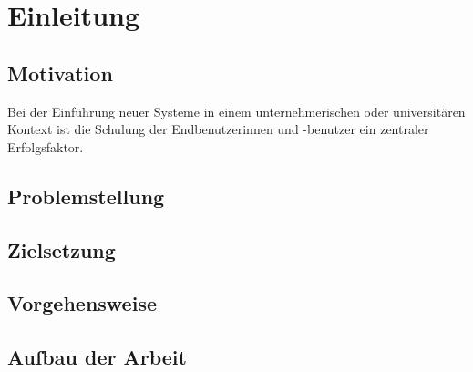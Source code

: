 \chapter{Einleitung}
\section{Motivation}
Bei der Einführung neuer Systeme in einem unternehmerischen oder universitären
Kontext ist die Schulung der Endbenutzerinnen und -benutzer ein zentraler Erfolgsfaktor.
\section{Problemstellung}
\section{Zielsetzung}
\section{Vorgehensweise}
\section{Aufbau der Arbeit}



